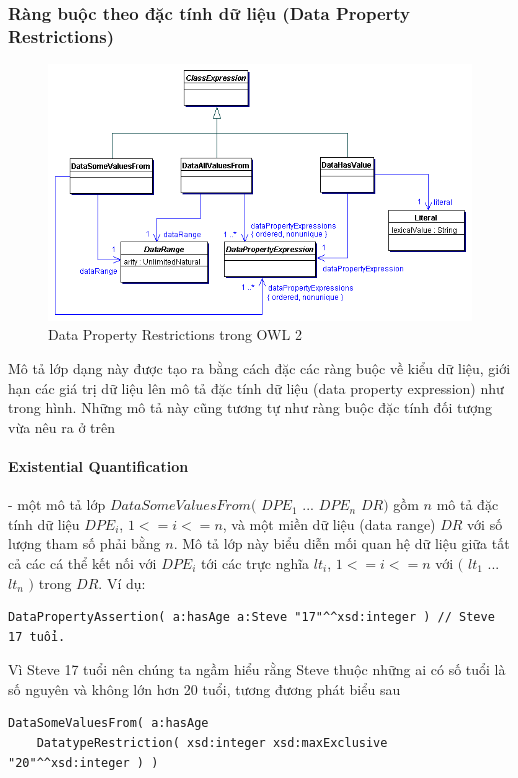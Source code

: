 \subsubsection{Ràng buộc theo đặc tính dữ liệu (Data Property Restrictions)}
\begin{figure}[h]
	\centering
	\includegraphics[width=120mm]{Figures/ce_3.png}
	\caption{Data Property Restrictions trong OWL 2\label{overflow}}
\end{figure}
Mô tả lớp dạng này được tạo ra bằng cách đặc các ràng buộc về kiểu dữ liệu, giới hạn các giá trị dữ liệu lên mô tả đặc tính dữ liệu (data property expression) như trong hình. Những mô tả này cũng tương tự như ràng buộc đặc tính đối tượng vừa nêu ra ở trên

\paragraph{Existential Quantification} - một mô tả lớp $DataSomeValuesFrom($ $DPE_{1}$ ... $DPE_{n}$ $DR)$ gồm $n$ mô tả đặc tính dữ liệu $DPE_{i}$, $1<=i<=n$, và một miền dữ liệu (data range) $DR$ với số lượng tham số phải bằng $n$. Mô tả lớp này biểu diễn mối quan hệ dữ liệu giữa tất cả các cá thể kết nối với $DPE_{i}$ tới các trực nghĩa $lt_{i}$, $1<=i<=n$ với $($ $lt_{1}$ ... $lt_{n}$ $)$ trong $DR$. Ví dụ:
\begin{verbatim}
DataPropertyAssertion( a:hasAge a:Steve "17"^^xsd:integer ) // Steve 17 tuổi.
\end{verbatim}
Vì Steve 17 tuổi nên chúng ta ngầm hiểu rằng Steve thuộc những ai có số tuổi là số nguyên và không lớn hơn 20 tuổi, tương đương phát biểu sau
\begin{verbatim}
DataSomeValuesFrom( a:hasAge 
    DatatypeRestriction( xsd:integer xsd:maxExclusive "20"^^xsd:integer ) )
\end{verbatim}

